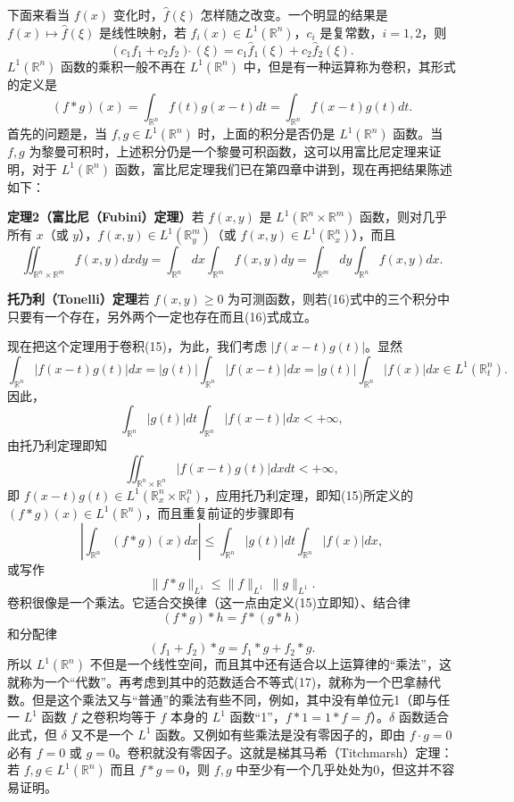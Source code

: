 下面来看当 $f(x)$ 变化时，$\widehat f(\xi)$ 怎样随之改变。一个明显的结果是 $f(x)\mapsto\widehat f(\xi)$ 是线性映射，若 $f_i(x)\in L^1(\mathbb R^n)$，$c_i$ 是复常数，$i=1,2$，则
\begin{equation}
 (c_1f_1+c_2f_2)\widehat{\ }(\xi)=c_1\widehat f_1(\xi)+c_2\widehat f_2(\xi).
 \tag{14}
\end{equation}
$L^1(\mathbb R^n)$ 函数的乘积一般不再在 $L^1(\mathbb R^n)$ 中，但是有一种运算称为卷积，其形式的定义是
\begin{equation}
 (f*g)(x)=\int_{\mathbb R^n}f(t)g(x-t)dt
 =\int_{\mathbb R^n}f(x-t)g(t)dt.
 \tag{15}
\end{equation}
首先的问题是，当 $f,g\in L^1(\mathbb R^n)$ 时，上面的积分是否仍是 $L^1(\mathbb R^n)$ 函数。当 $f,g$ 为黎曼可积时，上述积分仍是一个黎曼可积函数，这可以用富比尼定理来证明，对于 $L^1(\mathbb R^n)$ 函数，富比尼定理我们已在第四章中讲到，现在再把结果陈述如下：

\noindent\textbf{定理2（富比尼（Fubini）定理）}\quad 若 $f(x,y)$ 是 $L^1(\mathbb R^n\times\mathbb R^m)$ 函数，则对几乎所有 $x$（或 $y$），$f(x,y)\in L^1(\mathbb R_y^m)$（或 $f(x,y)\in L^1(\mathbb R_x^n)$），而且
\begin{equation}
 \iint_{\mathbb R^n\times\mathbb R^m}f(x,y)dxdy
 =\int_{\mathbb R^n}dx\int_{\mathbb R^m}f(x,y)dy
 =\int_{\mathbb R^m}dy\int_{\mathbb R^n}f(x,y)dx.
 \tag{16}
\end{equation}

\noindent\textbf{托乃利（Tonelli）定理}\quad 若 $f(x,y)\ge0$ 为可测函数，则若(16)式中的三个积分中只要有一个存在，另外两个一定也存在而且(16)式成立。

现在把这个定理用于卷积(15)，为此，我们考虑 $|f(x-t)g(t)|$。显然
\[
 \int_{\mathbb R^n}|f(x-t)g(t)|dx
 =|g(t)|\int_{\mathbb R^n}|f(x-t)|dx
 =|g(t)|\int_{\mathbb R^n}|f(x)|dx\in L^1(\mathbb R_t^n).
\]
因此，
\[
 \int_{\mathbb R^n}|g(t)|dt\int_{\mathbb R^n}|f(x-t)|dx<+\infty,
\]
由托乃利定理即知
\[
 \iint_{\mathbb R^n\times\mathbb R^n}|f(x-t)g(t)|dxdt<+\infty,
\]
即 $f(x-t)g(t)\in L^1(\mathbb R_x^n\times\mathbb R_t^n)$，应用托乃利定理，即知(15)所定义的 $(f*g)(x)\in L^1(\mathbb R^n)$，而且重复前证的步骤即有
\begin{equation}
 \left|\int_{\mathbb R^n}(f*g)(x)dx\right|
 \le\int_{\mathbb R^n}|g(t)|dt\int_{\mathbb R^n}|f(x)|dx,
 \tag{17}
\end{equation}
或写作
\begin{equation}
 \|f*g\|_{L^1}\le\|f\|_{L^1}\,\|g\|_{L^1}.
 \tag{17'}
\end{equation}
卷积很像是一个乘法。它适合交换律（这一点由定义(15)立即知）、结合律
\[
 (f*g)*h=f*(g*h)
\]
和分配律
\[
 (f_1+f_2)*g=f_1*g+f_2*g.
\]
所以 $L^1(\mathbb R^n)$ 不但是一个线性空间，而且其中还有适合以上运算律的“乘法”，这就称为一个“代数”。再考虑到其中的范数适合不等式(17)，就称为一个巴拿赫代数。但是这个乘法又与“普通”的乘法有些不同，例如，其中没有单位元1（即与任一 $L^1$ 函数 $f$ 之卷积均等于 $f$ 本身的 $L^1$ 函数“1”，$f*1=1*f=f$）。$\delta$ 函数适合此式，但 $\delta$ 又不是一个 $L^1$ 函数。又例如有些乘法是没有零因子的，即由 $f\cdot g=0$ 必有 $f=0$ 或 $g=0$。卷积就没有零因子。这就是梯其马希（Titchmarsh）定理：若 $f,g\in L^1(\mathbb R^n)$ 而且 $f*g=0$，则 $f,g$ 中至少有一个几乎处处为0，但这并不容易证明。

